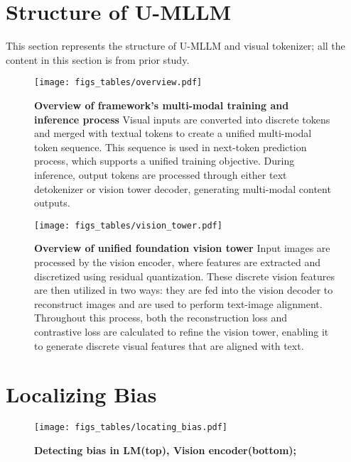 \section{Structure of U-MLLM}
This section represents the structure of U-MLLM and visual tokenizer; all the content in this section is from prior study\cite{wu2024vila}. 

\begin{figure}[ht]
    \centering
    \texttt{[image: figs\_tables/overview.pdf]}
    \caption{\textbf{Overview of framework’s multi-modal training and inference process\cite{wu2024vila}} Visual inputs are converted into discrete tokens and merged with textual tokens to create a unified multi-modal token sequence. This sequence is used in next-token prediction process, which supports a unified training objective. During inference, output tokens are processed through either text detokenizer or vision tower decoder, generating multi-modal content outputs\cite{wu2024vila}.}
    \label{fig:unified_model}
\end{figure}


\begin{figure}[ht]
    \centering
    \texttt{[image: figs\_tables/vision\_tower.pdf]}
    \caption{
    \textbf{Overview of unified foundation vision tower\cite{wu2024vila}} Input images are processed by the vision encoder, where features are extracted and discretized using residual quantization. These discrete vision features are then utilized in two ways: they are fed into the vision decoder to reconstruct images and are used to perform text-image alignment. Throughout this process, both the reconstruction loss and contrastive loss are calculated to refine the vision tower, enabling it to generate discrete visual features that are aligned with text\cite{wu2024vila}.}
    \label{fig:vision_tower}
\end{figure}

\newpage
 
\section{Localizing Bias}
\label{subsec:localizing-bias}
\begin{figure*}[ht]
    \centering
    \vspace{-8pt}
    \texttt{[image: figs\_tables/locating\_bias.pdf]}
    \caption{
    \textbf{Detecting bias in LM(top), Vision encoder(bottom);}
    \label{fig:locating_bias}}
    \vspace{-10pt}
\end{figure*}


